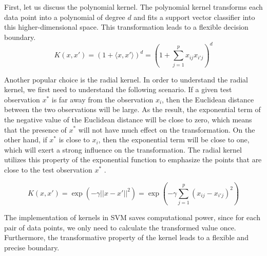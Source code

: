 First, let us discuss the polynomial kernel. The polynomial kernel transforms each data point into a polynomial
of degree $d$ and fits a support vector classifier into this higher-dimensional space. This 
transformation leads to a flexible decision boundary. 
\begin{equation}
    K(x, x') = (1 + \langle x, x' \rangle)^d = (1 + \sum_{j=1}^px_{ij}x_{i'j})^d
\end{equation}

Another popular choice is the radial kernel. In order to understand the radial kernel, we first need to understand
the following scenario.
If a given test observation $x^*$ is far away from the observation $x_i$,
then the Euclidean distance between the two observations will be large.
As the result, the exponential term of the negative value of the Euclidean distance will be close to zero,
which means that the presence of $x^*$ will not have much effect on the transformation.
On the other hand, if $x^*$ is close to $x_i$, then the exponential term will be close to one, which
will exert a strong influence on the transformation. The radial kernel utilizes this property of the
exponential function to emphasize the points that are close to the test observation $x^*$ \cite{R9}.

\begin{equation}
    K(x, x') = \exp(-\gamma ||x - x'||^2) = \exp(-\gamma \sum_{j=1}^p(x_{ij} - x_{i'j})^2)
\end{equation}

The implementation of kernels in SVM saves computational power, since for each pair of data points, we
only need to calculate the transformed value once. Furthermore, the transformative property of the
kernel leads to a flexible and precise boundary. \cite{R9}
